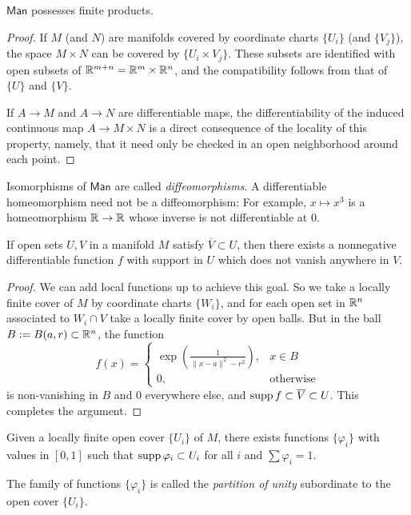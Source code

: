 \begin{theorem}
    $\mathsf{Man}$ possesses finite products.
\end{theorem}

\begin{proof}
    If $M$ (and $N$) are manifolds covered by coordinate charts $\{U_i\}$ (and $\{V_j\}$), the space $M\times N$ can be covered by $\{U_i\times V_j\}$. These subsets are identified with open subsets of $\mathbb{R}^{m+n}=\mathbb{R}^m\times\mathbb{R}^n$, and the compatibility follows from that of $\{U\}$ and $\{V\}$.

    If $A\to M$ and $A\to N$ are differentiable maps, the differentiability of the induced continuous map $A\to M\times N$ is a direct consequence of the locality of this property, namely, that it need only be checked in an open neighborhood around each point.
\end{proof}

\begin{example}
    Isomorphisms of $\mathsf{Man}$ are called \emph{diffeomorphisms}. A differentiable homeomorphism need not be a diffeomorphism: For example, $x\mapsto x^3$ is a homeomorphism $\mathbb{R}\to\mathbb{R}$ whose inverse is not differentiable at $0$.
\end{example}

\begin{theorem}
    If open sets $U,V$ in a manifold $M$ satisfy $\overline{V}\subset U$, then there exists a nonnegative differentiable function $f$ with support in $U$ which does not vanish anywhere in $V$.
\end{theorem}

\begin{proof}
    We can add local functions up to achieve this goal. So we take a locally finite cover of $M$ by coordinate charts $\{W_i\}$, and for each open set in $\mathbb{R}^n$ associated to $W_i\cap V$ take a locally finite cover by open balls. But in the ball $B:=B(a,r)\subset\mathbb{R}^n$, the function
    $$f(x)=\begin{cases}
        \exp\left(\frac{1}{\|x-a\|^2-r^2}\right), & x\in B \\
        0, &\text{otherwise}
    \end{cases}$$
    is non-vanishing in $B$ and $0$ everywhere else, and $\operatorname{supp} f\subset\overline{V}\subset U$. This completes the argument.
\end{proof}

\begin{corollary}
    Given a locally finite open cover $\{U_i\}$ of $M$, there exists functions $\{\varphi_i\}$ with values in $[0,1]$ such that $\operatorname{supp}\varphi_i\subset U_i$ for all $i$ and $\sum\varphi_i=1$.

    The family of functions $\{\varphi_i\}$ is called the \emph{partition of unity} subordinate to the open cover $\{U_i\}$.
\end{corollary}

